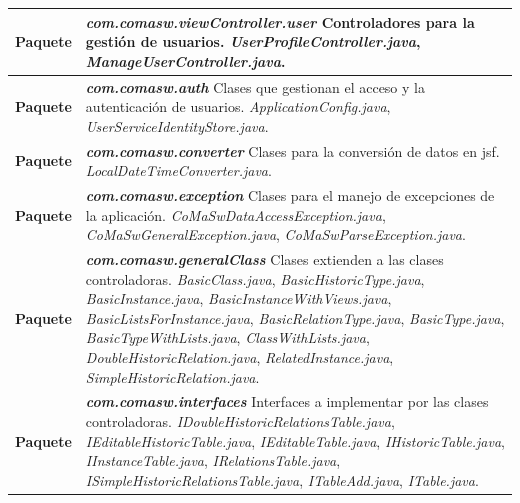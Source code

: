\begin{longtable}{m{3cm} m{12cm}}
	\textbf{Paquete} & \textit{\textbf{com.comasw.viewController.user}} \newline
     Controladores para la gestión de usuarios.\newline
\textit{UserProfileController.java},
\textit{ManageUserController.java}.
	\\\hline

	\textbf{Paquete} & \textit{\textbf{com.comasw.auth}} \newline
     Clases que gestionan el acceso y la autenticación de usuarios.\newline
\textit{ApplicationConfig.java},
\textit{UserServiceIdentityStore.java}.
	\\\hline

	\textbf{Paquete} & \textit{\textbf{com.comasw.converter}} \newline
     Clases para la conversión de datos en \acrshort{jsf}.\newline
\textit{LocalDateTimeConverter.java}.
	\\\hline

	\textbf{Paquete} & \textit{\textbf{com.comasw.exception}} \newline
     Clases para el manejo de excepciones de la aplicación.\newline
\textit{CoMaSwDataAccessException.java},
\textit{CoMaSwGeneralException.java},
\textit{CoMaSwParseException.java}.
	\\\hline

	\textbf{Paquete} & \textit{\textbf{com.comasw.generalClass}} \newline
     Clases extienden a las clases controladoras.\newline
\textit{BasicClass.java},
\textit{BasicHistoricType.java},
\textit{BasicInstance.java},
\textit{BasicInstanceWithViews.java},
\textit{BasicListsForInstance.java},
\textit{BasicRelationType.java},
\textit{BasicType.java},
\textit{BasicTypeWithLists.java},
\textit{ClassWithLists.java},
\textit{DoubleHistoricRelation.java},
\textit{RelatedInstance.java},
\textit{SimpleHistoricRelation.java}.
	\\\hline

	\textbf{Paquete} & \textit{\textbf{com.comasw.interfaces}} \newline
     Interfaces a implementar por las clases controladoras.\newline
\textit{IDoubleHistoricRelationsTable.java},
\textit{IEditableHistoricTable.java},
\textit{IEditableTable.java},
\textit{IHistoricTable.java},
\textit{IInstanceTable.java},
\textit{IRelationsTable.java},
\textit{ISimpleHistoricRelationsTable.java},
\textit{ITableAdd.java},
\textit{ITable.java}.
	\\\hline


\end{longtable}
